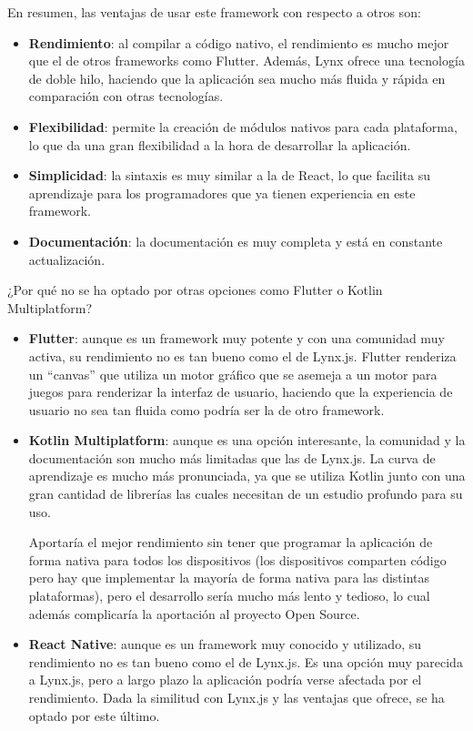 En resumen, las ventajas de usar este framework con respecto a otros son:
\begin{itemize}
    \item \textbf{Rendimiento}: al compilar a código nativo, el rendimiento es mucho mejor que el de otros frameworks como Flutter. Además, Lynx ofrece una tecnología de doble hilo, haciendo que la aplicación sea mucho más fluida y rápida en comparación con otras tecnologías.
    \item \textbf{Flexibilidad}: permite la creación de módulos nativos para cada plataforma, lo que da una gran flexibilidad a la hora de desarrollar la aplicación.
    \item \textbf{Simplicidad}: la sintaxis es muy similar a la de React, lo que facilita su aprendizaje para los programadores que ya tienen experiencia en este framework.
    \item \textbf{Documentación}: la documentación es muy completa y está en constante actualización.
\end{itemize}

¿Por qué no se ha optado por otras opciones como Flutter o Kotlin Multiplatform?
\begin{itemize}
    \item \textbf{Flutter}: aunque es un framework muy potente y con una comunidad muy activa, su rendimiento no es tan bueno como el de Lynx.js.
        Flutter renderiza un ``canvas'' que utiliza un motor gráfico que se asemeja a un motor para juegos para renderizar la interfaz de usuario, haciendo que la experiencia de usuario no sea tan fluida como podría ser la de otro framework.
    \item \textbf{Kotlin Multiplatform}: aunque es una opción interesante, la comunidad y la documentación son mucho más limitadas que las de Lynx.js. La curva de aprendizaje es mucho más pronunciada, ya que se utiliza Kotlin junto con una gran cantidad de librerías las cuales necesitan de un estudio profundo para su uso.

        Aportaría el mejor rendimiento sin tener que programar la aplicación de forma nativa para todos los dispositivos (los dispositivos comparten código pero hay que implementar la mayoría de forma nativa para las distintas plataformas), pero el desarrollo sería mucho más lento y tedioso, lo cual además complicaría la aportación al proyecto Open Source.
    \item \textbf{React Native}: aunque es un framework muy conocido y utilizado, su rendimiento no es tan bueno como el de Lynx.js.
        Es una opción muy parecida a Lynx.js, pero a largo plazo la aplicación podría verse afectada por el rendimiento.
        Dada la similitud con Lynx.js y las ventajas que ofrece, se ha optado por este último.
\end{itemize}

